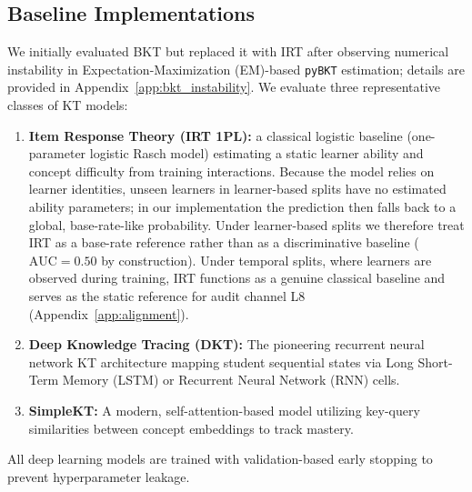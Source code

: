 \subsection{Baseline Implementations}
We initially evaluated BKT but replaced it with IRT after observing numerical instability in Expectation-Maximization (EM)-based \texttt{pyBKT} estimation; details are provided in Appendix~\ref{app:bkt_instability}. We evaluate three representative classes of KT models:
\begin{enumerate}
    \item \textbf{Item Response Theory (IRT 1PL):} a classical logistic baseline (one-parameter logistic Rasch model) estimating a static learner ability and concept difficulty from training interactions. Because the model relies on learner identities, unseen learners in learner-based splits have no estimated ability parameters; in our implementation the prediction then falls back to a global, base-rate-like probability. Under learner-based splits we therefore treat IRT as a base-rate reference rather than as a discriminative baseline ($\text{AUC} = 0.50$ by construction). Under temporal splits, where learners are observed during training, IRT functions as a genuine classical baseline and serves as the static reference for audit channel L8 (Appendix~\ref{app:alignment}).
    \item \textbf{Deep Knowledge Tracing (DKT):} The pioneering recurrent neural network KT architecture mapping student sequential states via Long Short-Term Memory (LSTM) or Recurrent Neural Network (RNN) cells.
    \item \textbf{SimpleKT:} A modern, self-attention-based model utilizing key-query similarities between concept embeddings to track mastery.
\end{enumerate}

All deep learning models are trained with validation-based early stopping to prevent hyperparameter leakage.

